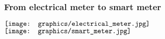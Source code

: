 \begin{frame}
  \frametitle{From electrical meter to smart meter}


\begin{minipage}{6in}
  
  $\vcenter{\hbox{\texttt{[image: graphics/electrical\_meter.jpg]}}}$
  \hspace*{.2in}
  $\vcenter{\hbox{\texttt{[image: graphics/smart\_meter.jpg]}}}$
  
\end{minipage}

\end{frame}

\begin{frame}
  
\end{frame}
